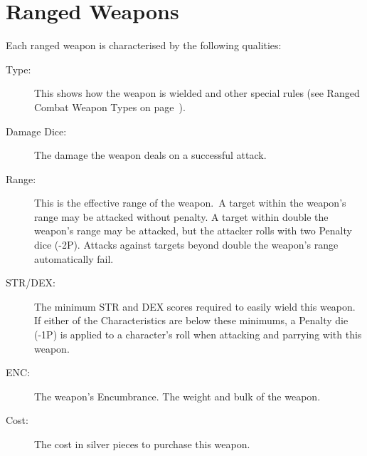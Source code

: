 \section{Ranged Weapons}
Each ranged weapon is characterised by the following qualities:
\begin{description}
	\item[Type:] This shows how the weapon is wielded and other special rules (see Ranged Combat Weapon Types on page~\pageref{sssec:ranged-combat-weapon-types}).
	\item[Damage Dice:] The damage the weapon deals on a successful attack. 
	\item[Range:] This is the effective range of the weapon. A target within the weapon’s range may be attacked without penalty. A target within double the weapon’s range may be attacked, but the attacker rolls with two Penalty dice (-2P). Attacks against targets beyond double the weapon’s range automatically fail.
	\item[STR/DEX:] The minimum STR and DEX scores required to easily wield this weapon. If either of the Characteristics are below these minimums, a Penalty die (-1P) is applied to a character’s roll when attacking and parrying with this weapon.
	\item[ENC:] The weapon’s Encumbrance. The weight and bulk of the weapon. 
	\item[Cost:] The cost in silver pieces to purchase this weapon.
\end{description}


